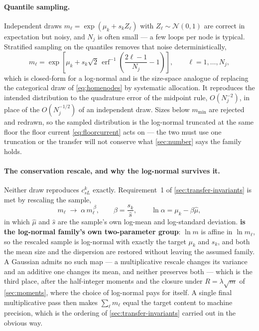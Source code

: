 \documentclass{article}
\begin{document}
\paragraph{Quantile sampling.} Independent draws $m_\ell=\exp(\mu_k+s_kZ_\ell)$
with $Z_\ell\sim\mathcal N(0,1)$ are correct in expectation but noisy, and $N_j$
is often small --- a few loops per node is typical. Stratified sampling on the
quantiles removes that noise deterministically,
\begin{equation}
  m_\ell=\exp\!\left[\mu_k+s_k\sqrt2\,\operatorname{erf}^{-1}
      \!\left(\frac{2\ell-1}{N_j}-1\right)\right],
  \qquad \ell=1,\dots,N_j,
  \label{eq:quantile}
\end{equation}
which is closed-form for a log-normal and is the size-space analogue of
replacing the categorical draw of \cref{eq:homenodes} by systematic allocation.
It reproduces the intended distribution to the quadrature error of the midpoint
rule, $O(N_j^{-2})$, in place of the $O(N_j^{-1/2})$ of an independent draw.
Sizes below $m_{\min}$ are rejected and redrawn, so the sampled distribution is
the log-normal truncated at the same floor the floor current
\cref{eq:floorcurrent} acts on --- the two must use one truncation or the
transfer will not conserve what \cref{sec:number} says the family holds.

\paragraph{The conservation rescale, and why the log-normal survives it.}
Neither draw reproduces $c^k_{sL}$ exactly. Requirement~1 of
\cref{sec:transfer-invariants} is met by rescaling the sample,
\begin{equation}
  m_\ell\;\longrightarrow\;\alpha\,m_\ell^{\,\beta},
  \qquad
  \beta=\frac{s_k}{\hat s},
  \qquad
  \ln\alpha=\mu_k-\beta\hat\mu,
  \label{eq:rescale}
\end{equation}
in which $\hat\mu$ and $\hat s$ are the sample's own log-mean and log-standard
deviation. \textbf{ is the log-normal family's own
two-parameter group}: $\ln m$ is affine in $\ln m_\ell$, so the rescaled sample
is log-normal with exactly the target $\mu_k$ and $s_k$, and both the mean size
and the dispersion are restored without leaving the assumed family. A Gaussian
admits no such map --- a multiplicative rescale changes its variance and an
additive one changes its mean, and neither preserves both --- which is the third
place, after the half-integer moments and the closure under $R=\lambda\sqrt m$
of \cref{sec:moments}, where the choice of log-normal pays for itself. A single
final multiplicative pass then makes $\sum_\ell m_\ell$ equal the target content
to machine precision, which is the ordering of \cref{sec:transfer-invariants}
carried out in the obvious way.
\end{document}
